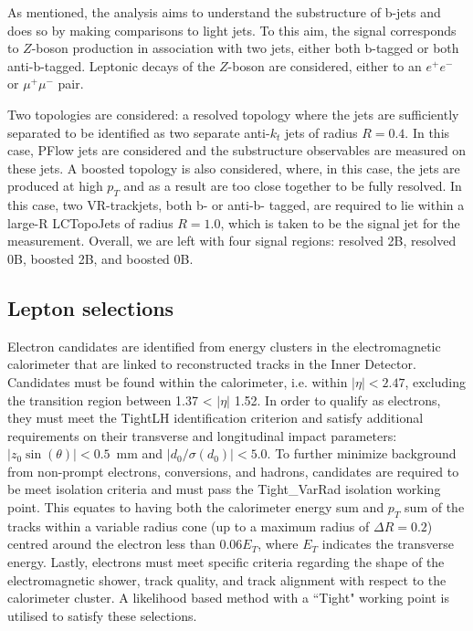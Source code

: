 \documentclass[10pt,a4paper]{book}
\begin{document}
As mentioned, the analysis aims to understand the substructure of b-jets and does so by making comparisons to light jets. To this aim, the signal corresponds to $Z$-boson production in association with two jets, either both b-tagged or both anti-b-tagged. Leptonic decays of the $Z$-boson are considered, either to an $e^+e^-$ or $\mu^+\mu^-$ pair. 

Two topologies are considered: a resolved topology where the jets are sufficiently separated to be identified as two separate anti-$k_t$ jets of radius $R = 0.4$. In this case, PFlow jets are considered and the substructure observables are measured on these jets. A boosted topology is also considered, where, in this case, the jets are produced at high $p_T$ and as a result are too close together to be fully resolved. In this case, two VR-trackjets, both b- or anti-b- tagged, are required to lie within a large-R LCTopoJets of radius $R = 1.0$, which is taken to be the signal jet for the measurement. Overall, we are left with four signal regions: resolved 2B, resolved 0B, boosted 2B, and boosted 0B.


\subsection{Lepton selections}
Electron candidates are identified from energy clusters in the electromagnetic calorimeter that are linked to reconstructed tracks in the Inner Detector. Candidates must be found within the calorimeter, i.e. within $\vert \eta \vert < 2.47$, excluding the transition region between 1.37 < $\vert \eta \vert$ 1.52. In order to qualify as electrons, they must meet the TightLH identification criterion and satisfy additional requirements on their transverse and longitudinal impact parameters: $\vert z_0\sin(\theta)\vert  < 0.5$~mm and $\vert d_0/\sigma(d_0)\vert < 5.0$. To further minimize background from non-prompt electrons, conversions, and hadrons, candidates are required to be meet isolation criteria and must pass the Tight\_VarRad isolation working point. This equates to having both the calorimeter energy sum and $p_T$ sum of the tracks within a variable radius cone (up to a maximum radius of $\Delta R = 0.2$) centred around the electron less than $0.06 E_T$, where $E_T$ indicates the transverse energy. Lastly, electrons must meet specific criteria regarding the shape of the electromagnetic shower, track quality, and track alignment with respect to the calorimeter cluster. A likelihood based method with a ``Tight" working point is utilised to satisfy these selections.
\end{document}
